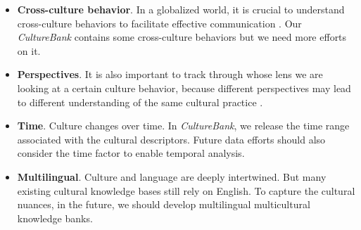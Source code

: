\documentclass{article} %
\newcommand{\dataname}{\textit{CultureBank}\xspace}
\begin{document}
\begin{itemize}
    
    \item \textbf{Cross-culture behavior}. %
    In a globalized world, it is crucial to understand cross-culture behaviors to facilitate effective communication \citep{watkins2012learning}. Our \dataname contains some cross-culture behaviors but we need more efforts on it. 
    \item \textbf{Perspectives}. It is also important to track through whose lens we are looking at a certain culture behavior, because different perspectives may lead to different understanding of the same cultural practice \citep{iyengar1999independence, brewer1999psychology}. %
\item \textbf{Time}. Culture changes over time. In \dataname, we release the time range associated with the cultural descriptors. Future data efforts should also consider the time factor to enable temporal analysis. %

    \item \textbf{Multilingual}. Culture and language are deeply intertwined. But many existing cultural knowledge bases still rely on English. To capture the cultural nuances, in the future, we should develop multilingual multicultural knowledge banks. 



\end{itemize}
\end{document}
